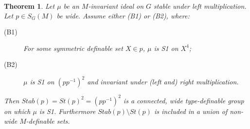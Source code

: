 \documentclass[12pt]{article}
\newtheorem{thm}{Theorem}[section]
\theoremstyle{definition}
\theoremstyle{mystyle}
\theoremstyle{remark}
\newcommand{\tp}{\mathrm{tp}}
\begin{document}
\begin{thm}\label{th_babystab}
Let $\mu$ be an $M$-invariant ideal on $G$ stable under left multiplication. Let $p\in S_G(M)$ be wide. Assume either (B1) or (B2), where:
\begin{description}
\item[(B1)] For some symmetric definable set $X\in p$, $\mu$ is S1 on $X^4$;

\item[(B2)] $\mu$ is S1 on $(pp^{-1})^2$ and invariant under (left and) right multiplication.


\end{description}
Then $Stab(p)=St(p)^2 = (pp^{-1})^2$ is a connected, wide type-definable group on which $\mu$ is S1. Furthermore $Stab(p)\setminus St(p)$ is included in a union of non-wide $M$-definable sets.
\end{thm}
\end{document}
